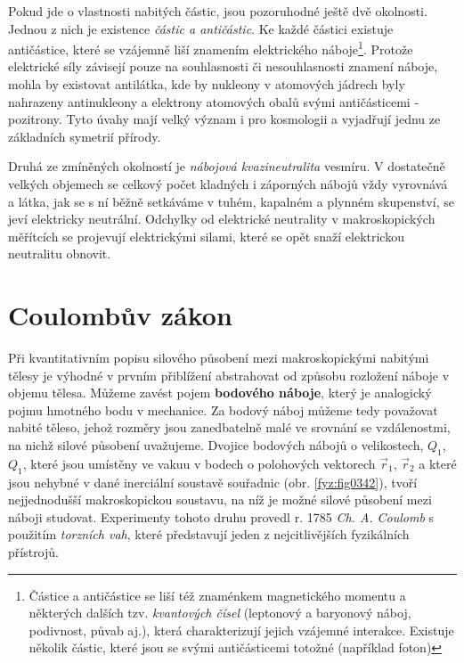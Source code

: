     Pokud jde o vlastnosti nabitých částic, jsou pozoruhodné ještě dvě okolnosti. Jednou z nich je
    existence \emph{částic a antičástic}. Ke každé částici existuje antičástice, které se vzájemně
    liší znamením elektrického náboje\footnote{Částice a antičástice se liší též znaménkem
    magnetického momentu a některých dalších tzv. \emph{kvantových čísel} (leptonový a  baryonový
    náboj, podivnost, půvab aj.), která charakterizují jejich vzájemné interakce. Existuje několik
    částic, které jsou se svými antičásticemi totožné (například foton)}. Protože elektrické síly
    závisejí pouze na souhlasnosti či nesouhlasnosti znamení náboje, mohla by existovat antilátka,
    kde by nukleony v atomových jádrech byly nahrazeny antinukleony a elektrony atomových obalů
    svými antičásticemi - pozitrony. Tyto úvahy mají velký význam i pro kosmologii a vyjadřují jednu
    ze základních symetrií přírody.
    
    Druhá ze zmíněných okolností je \emph{nábojová kvazineutralita} vesmíru. V dostatečně velkých
    objemech se celkový počet kladných i záporných nábojů vždy vyrovnává a látka, jak se s ní běžně
    setkáváme v tuhém, kapalném a plynném skupenství, se jeví elektricky neutrální. Odchylky od
    elektrické neutrality v makroskopických měřítcích se projevují elektrickými silami, které se
    opět snaží elektrickou neutralitu obnovit.
    
  \section{Coulombův zákon}\label{fyz:IIIchapIsecII}
    Při kvantitativním popisu silového působení mezi makroskopickými nabitými tělesy je výhodné v
    prvním přiblížení abstrahovat od způsobu rozložení náboje v objemu tělesa. Můžeme zavést pojem
    \textbf{bodového náboje}, který je analogický pojmu hmotného bodu v mechanice. Za bodový náboj
    můžeme tedy považovat nabité těleso, jehož rozměry jsou zanedbatelně malé ve srovnání se
    vzdálenostmi, na nichž silové působení uvažujeme. Dvojice bodových nábojů o velikostech,
    \(Q_1\), \(Q_1\), které jsou umístěny ve vakuu v bodech o polohových vektorech \(\vec{r}_1\),
    \(\vec{r}_2\) a které jsou nehybné v dané inerciální soustavě souřadnic (obr. \ref{fyz:fig0342}),
    tvoří nejjednodušší makroskopickou soustavu, na níž je možné silové působení mezi náboji
    studovat. Experimenty tohoto druhu provedl r. 1785 \emph{Ch. A. Coulomb} s použitím
    \emph{torzních vah}, které představují jeden z nejcitlivějších fyzikálních přístrojů. 

